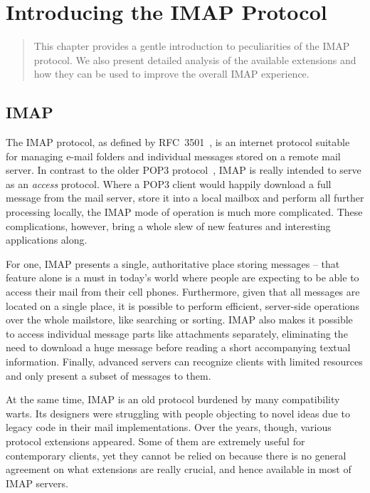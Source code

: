 \documentclass[trojita]{subfiles}
\begin{document}
\chapter{Introducing the IMAP Protocol}
\label{sec:imap-protocol}

\begin{abstract}
This chapter provides a gentle introduction to peculiarities of the IMAP protocol.  We also present detailed analysis of
the available extensions and how they can be used to improve the overall IMAP experience.
\end{abstract}

\section{IMAP}

The IMAP protocol, as defined by RFC~3501~\cite{rfc3501}, is an internet protocol suitable for managing e-mail folders
and individual messages stored on a remote mail server.  In contrast to the older POP3 protocol~\cite{rfc1939}, IMAP is
really intended to serve as an {\em access} protocol.  Where a POP3 client would happily download a full message from
the mail server, store it into a local mailbox and perform all further processing locally, the IMAP mode of operation is
much more complicated.  These complications, however, bring a whole slew of new features and interesting applications
along.

For one, IMAP presents a single, authoritative place storing messages -- that feature alone is a must in today's world
where people are expecting to be able to access their mail from their cell phones.  Furthermore, given that all messages
are located on a single place, it is possible to perform efficient, server-side operations over the whole mailstore,
like searching or sorting.  IMAP also makes it possible to access individual message parts like attachments separately,
eliminating the need to download a huge message before reading a short accompanying textual information.  Finally,
advanced servers can recognize clients with limited resources and only present a subset of messages to them.

At the same time, IMAP is an old protocol burdened by many compatibility warts.  Its designers were struggling with
people objecting to novel ideas due to legacy code in their mail implementations.  Over the years, though, various
protocol extensions appeared.  Some of them are extremely useful for contemporary clients, yet they cannot be relied on
because there is no general agreement on what extensions are really crucial, and hence available in most of IMAP
servers.
\end{document}
